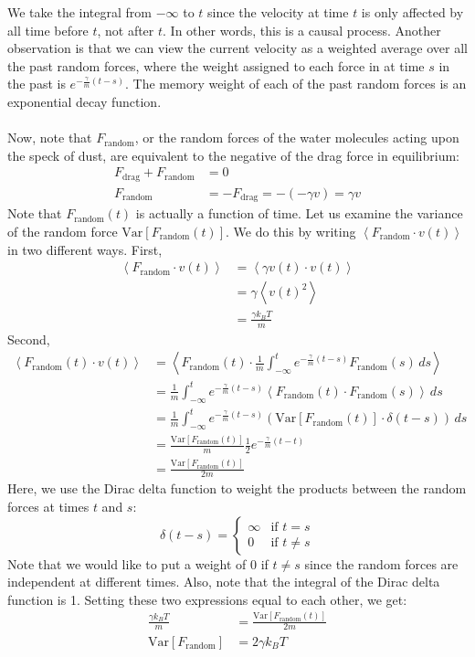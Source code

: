 \documentclass{article}
\newcommand{\Var}{\mathrm{Var}}
\begin{document}
We take the integral from $-\infty$ to $t$ since the velocity at time $t$ is only affected by all time before $t$, not after $t$. In other words, this is a causal process. Another observation is that we can view the current velocity as a weighted average over all the past random forces, where the weight assigned to each force in at time $s$ in the past is $e^{-\frac{\gamma}{m}(t-s)}$. The memory weight of each of the past random forces is an exponential decay function. 
\\
\\
Now, note that $F_{\text{random}}$, or the random forces of the water molecules acting upon the speck of dust, are equivalent to the negative of the drag force in equilibrium:
\begin{align*}
    F_{\text{drag}} + F_{\text{random}} &= 0\\
    F_{\text{random}} &= - F_{\text{drag}} = -(-\gamma v) = \gamma v
\end{align*}
Note that $F_{\text{random}}(t)$ is actually a function of time. Let us examine the variance of the random force $\Var[F_{\text{random}}(t)]$. We do this by writing $\left<F_{\text{random}}\cdot v(t)\right>$ in two different ways. First,
\begin{align*}
    \left<F_{\text{random}}\cdot v(t)\right> &= \left<\gamma v(t)\cdot v(t)\right>\\
    &= \gamma \left<v(t)^2\right>\\
    &= \frac{\gamma k_B T}{m}
\end{align*}
Second, 
\begin{align*}
    \left<F_{\text{random}}(t)\cdot v(t)\right> &= \left<F_{\text{random}}(t) \cdot \frac{1}{m}\int_{-\infty}^t e^{-\frac{\gamma}{m}(t-s)} F_{\text{random}}(s)\,ds\right>\\
    &= \frac{1}{m}\int_{-\infty}^t e^{-\frac{\gamma}{m}(t-s)} \left<F_{\text{random}}(t) \cdot  F_{\text{random}}(s)\right> \,ds\\
    &= \frac{1}{m}\int_{-\infty}^t e^{-\frac{\gamma}{m}(t-s)} (\Var[F_{\text{random}}(t)] \cdot \delta(t-s)) \,ds\\
    &= \frac{\Var[F_{\text{random}}(t)]}{m} \frac{1}{2} e^{-\frac{\gamma}{m}(t-t)}\\
    &= \frac{\Var[F_{\text{random}}(t)]}{2m}
\end{align*}
Here, we use the Dirac delta function to weight the products between the random forces at times $t$ and $s$:
\[\delta(t-s)=
\begin{cases} 
      \infty & \text{if } t=s \\
      0 & \text{if } t \neq s 
\end{cases}\]
Note that we would like to put a weight of 0 if $t \neq s$ since the random forces are independent at different times. Also, note that the integral of the Dirac delta function is 1. Setting these two expressions equal to each other, we get:
\begin{align*}
    \frac{\gamma k_B T}{m} &= \frac{\Var[F_{\text{random}}(t)]}{2m}\\
    \Var[F_{\text{random}}] &= 2\gamma k_B T
\end{align*}
\end{document}
